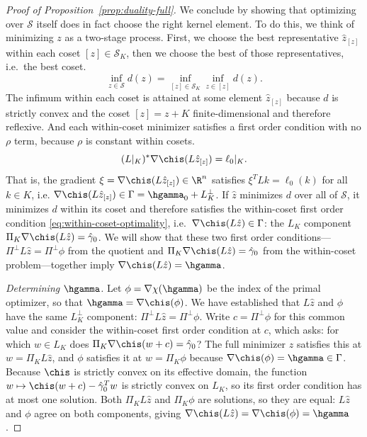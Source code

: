 \documentclass{article}
\newcommand{\calS}{\mathcal{S}}
\begin{document}
\begin{proof}[Proof of
Proposition~\ref{prop:duality-full}]
We conclude by showing that optimizing over $\calS$ itself does in fact choose the right kernel element.  To do this, we think of minimizing $z$ as a two-stage process. First, we choose the best representative $\hat z_{[z]}$ within each coset $[z] \in \calS_K$,
then we choose the best of those representatives, i.e.\ the best coset.
\[
\inf_{z \in \calS} d(z) = \inf_{[z] \in \calS_K} \inf_{z \in [z]} d(z).
\]
The infimum within each coset is attained at some element $\hat z_{[z]}$ because $d$ is strictly convex and the coset $[z] = z + K$ finite-dimensional and therefore reflexive. And each within-coset minimizer satisfies a first order condition with no $\rho$ term, because $\rho$ is constant within cosets.
\begin{equation}
\label{eq:within-coset-optimality}
(L|_K)^* \nabla \chis(L \hat z_{[z]}) = \ell_0|_K.
\end{equation}%
That is, the gradient $\xi = \nabla \chis(L \hat z_{[z]}) \in \R^n$ satisfies $\xi^T L k = \ell_0(k)$ for all $k \in K$,  i.e. $\nabla \chis(L \hat z_{[z]}) \in \Gamma = \hgamma_0 + L_K^\perp$. If $\hat z$ minimizes $d$ over all of $\calS$, it minimizes $d$ within its coset and therefore satisfies the within-coset first order condition \eqref{eq:within-coset-optimality}, i.e.\ $\nabla \chis(L\hat z) \in \Gamma$: the $L_K$ component $\Pi_K\nabla\chis(L\hat z) = \hat\gamma_0$. We will show that these two first order conditions---$\Pi^\perp L\hat z = \Pi^\perp\phi$ from the quotient and $\Pi_K\nabla\chis(L\hat z) = \hat\gamma_0$ from the within-coset problem---together imply $\nabla\chis(L\hat z) = \hgamma$.

\textit{Determining $\hgamma$.} Let $\phi = \nabla\chi(\hgamma)$ be the index of the primal optimizer, so that $\hgamma = \nabla\chis(\phi)$. We have established that $L\hat z$ and $\phi$ have the same $L_K^\perp$ component: $\Pi^\perp L\hat z = \Pi^\perp\phi$. Write $c = \Pi^\perp\phi$ for this common value and consider the within-coset first order condition at $c$, which asks: for which $w \in L_K$ does $\Pi_K\nabla\chis(w + c) = \hat\gamma_0$? The full minimizer $\hat z$ satisfies this at $w = \Pi_K L\hat z$, and $\phi$ satisfies it at $w = \Pi_K\phi$ because $\nabla\chis(\phi) = \hgamma \in \Gamma$. Because $\chis$ is strictly convex on its effective domain, the function $w \mapsto \chis(w + c) - \hat\gamma_0^T w$ is strictly convex on $L_K$, so its first order condition has at most one solution. Both $\Pi_K L\hat z$ and $\Pi_K\phi$ are solutions, so they are equal: $L\hat z$ and $\phi$ agree on both components, giving $\nabla\chis(L\hat z) = \nabla\chis(\phi) = \hgamma$.


\end{proof}
\end{document}
